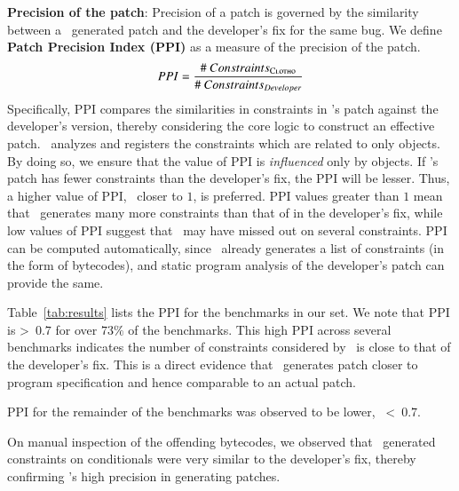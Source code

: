 \begin{mylist}
\item \textbf{Precision of the patch}: Precision of a patch is governed by the
similarity between a \tool\ generated patch and the developer's fix for the same
bug. We define \textbf{Patch Precision Index (PPI)} as a measure of the
precision of the patch.
$$PPI = \frac{\#~Constraints_{\textsc{Clotho}}}{\#~Constraints_{Developer}}$$
% 
Specifically, PPI compares the similarities in constraints in \tool's patch
against the developer's version, thereby considering the core logic to construct
an effective patch. \tool\ analyzes and registers the constraints which are
related to only  objects. By doing so, we ensure that the value of
PPI is \emph{influenced} only by  objects. If \tool's patch has
fewer constraints than the developer's fix, the PPI will be lesser. Thus, a
higher value of PPI, \ie\ closer to $1$, is preferred. PPI values greater than
$1$ mean that \tool\ generates many more constraints than that of in the
developer's fix, while low values of PPI suggest that \tool\ may have missed out
on several constraints. PPI can be computed automatically, since \tool\ already
generates a list of constraints (in the form of bytecodes), and static program
analysis of the developer's patch can provide the same.

Table~\ref{tab:results} lists the PPI for the benchmarks in our set. We note
that PPI is \textgreater\ $0.7$ for over $73\%$ of the benchmarks. This high PPI
across several benchmarks indicates the number of  constraints
considered by \tool\ is close to that of the developer's fix. This is a direct
evidence that \tool\ generates patch closer to program specification and hence
comparable to an actual patch. PPI for the remainder
of the benchmarks was observed to be lower, \ie\ \textless\ $0.7$. On manual inspection of the offending bytecodes, we
observed that \tool\ generated constraints on  conditionals were
very similar to the developer's fix, thereby confirming \tool's high precision
in generating patches.


\end{mylist}
